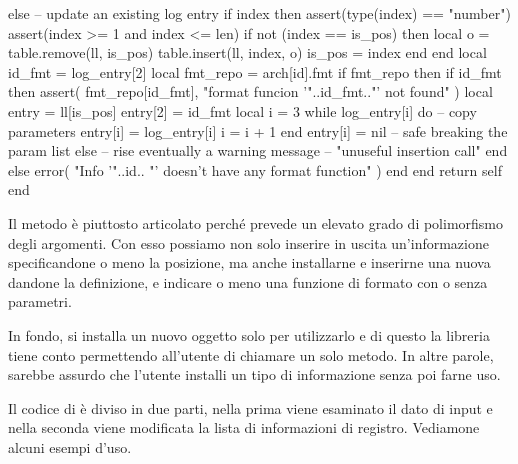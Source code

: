 \begin{lines}
    else -- update an existing log entry
        if index then
            assert(type(index) == "number")
            assert(index >= 1 and index <= len)
            if not (index == is_pos) then
                local o = table.remove(ll, is_pos)
                table.insert(ll, index, o)
                is_pos = index
            end
        end
        local id_fmt = log_entry[2]
        local fmt_repo = arch[id].fmt
        if fmt_repo then
            if id_fmt then
                assert(
                    fmt_repo[id_fmt],
                    "format funcion '"..id_fmt.."' not found"
                )
                local entry = ll[is_pos]
                entry[2] = id_fmt
                local i = 3
                while log_entry[i] do -- copy parameters
                   entry[i] = log_entry[i]
                   i = i + 1
                end
                entry[i] = nil -- safe breaking the param list
            else
                -- rise eventually a warning message
                -- "unuseful insertion call"
            end
        else
            error(
                "Info '"..id..
                "' doesn't have any format function"
            )
        end
    end
    return self
end
\end{lines}

Il metodo è piuttosto articolato perché prevede un elevato grado di polimorfismo
degli argomenti. Con esso possiamo non solo inserire in uscita un'informazione
specificandone o meno la posizione, ma anche installarne e inserirne una nuova
dandone la definizione, e indicare o meno una funzione di formato con o senza
parametri.

In fondo, si installa un nuovo oggetto  solo per utilizzarlo e di
questo la libreria tiene conto permettendo all'utente di chiamare un solo
metodo. In altre parole, sarebbe assurdo che l'utente installi un tipo di
informazione senza poi farne uso.

Il codice di  è diviso in due parti, nella prima viene
esaminato il dato di input e nella seconda viene modificata la lista di
informazioni di registro. Vediamone alcuni esempi d'uso.

